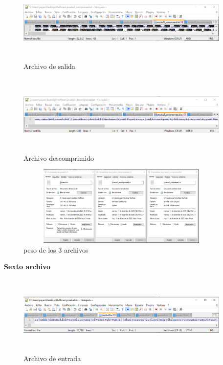 \documentclass[spanish]{article}
\begin{document}
	\begin{figure}[H]
		\centering
		\includegraphics[width=400px,height=150px]{captura33}
		\caption{Archivo de salida}
	\end{figure}
	\begin{figure}[H]
		\centering
		\includegraphics[width=400px,height=150px]{captura34}
		\caption{Archivo descomprimido}
	\end{figure}
	\begin{figure}[H]
		\centering
		\includegraphics[width=400px,height=150px]{captura35}
		\caption{peso de los 3 archivos}
	\end{figure}
	\textbf{Sexto archivo}
	\begin{figure}[H]
		\centering
		\includegraphics[width=400px,height=150px]{captura36}
		\caption{Archivo de entrada}
	\end{figure}
\end{document}
